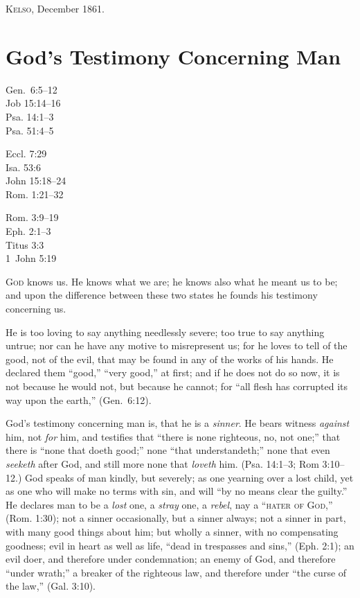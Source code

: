 \documentclass[
]{book}
\begin{document}
\textsc{Kelso}, December 1861.

\hypertarget{gods-testimony-concerning-man}{%
\chapter{God's Testimony Concerning Man}\label{gods-testimony-concerning-man}}

Gen.~6:5--12\\
Job 15:14--16\\
Psa. 14:1--3\\
Psa. 51:4--5

Eccl. 7:29\\
Isa. 53:6\\
John 15:18--24\\
Rom. 1:21--32

Rom. 3:9--19\\
Eph. 2:1--3\\
Titus 3:3\\
1~John 5:19

\textsc{God} knows us. He knows what we are; he knows also what he meant us to be; and upon the difference between these two states he founds his testimony concerning us.

He is too loving to say anything needlessly severe; too true to say anything untrue; nor can he have any motive to misrepresent us; for he loves to tell of the good, not of the evil, that may be found in any of the works of his hands. He declared them ``good,'' ``very good,'' at first; and if he does not do so now, it is not because he would not, but because he cannot; for ``all flesh has corrupted its way upon the earth,'' (Gen.~6:12).

God's testimony concerning man is, that he is a \emph{sinner}. He bears witness \emph{against} him, not \emph{for} him, and testifies that ``there is none righteous, no, not one;'' that there is ``none that doeth good;'' none ``that understandeth;'' none that even \emph{seeketh} after God, and still more none that \emph{loveth} him. (Psa. 14:1--3; Rom 3:10--12.) God speaks of man kindly, but severely; as one yearning over a lost child, yet as one who will make no terms with sin, and will ``by no means clear the guilty.'' He declares man to be a \emph{lost} one, a \emph{stray} one, a \emph{rebel}, nay a ``\textsc{hater of God},'' (Rom. 1:30); not a sinner occasionally, but a sinner always; not a sinner in part, with many good things about him; but wholly a sinner, with no compensating goodness; evil in heart as well as life, ``dead in trespasses and sins,'' (Eph. 2:1); an evil doer, and therefore under condemnation; an enemy of God, and therefore ``under wrath;'' a breaker of the righteous law, and therefore under ``the curse of the law,'' (Gal. 3:10).
\end{document}
